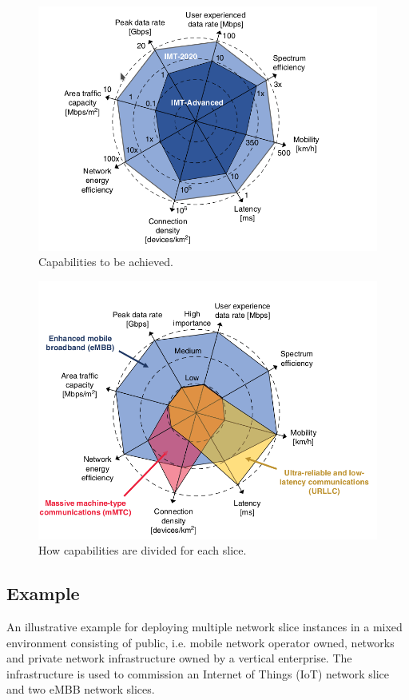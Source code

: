 \documentclass{report}
\begin{document}
\begin{figure}[h]
\centering
\includegraphics[scale=0.4]{pics/capabilities1.png}
\caption{Capabilities to be achieved.} 
\label{cap1}
\end{figure}
\begin{figure}[H]
\centering
\includegraphics[scale=0.4]{pics/capabilities2.png}
\caption{How capabilities are divided for each slice.} 
\label{cap2}
\end{figure}


\subsection{Example}
An illustrative example for deploying multiple network slice instances in a
mixed environment consisting of public, i.e. mobile network operator owned, networks and
private network infrastructure owned by a vertical enterprise. The infrastructure is used to commission an Internet of Things (IoT) network slice and two eMBB network slices. 
\end{document}
